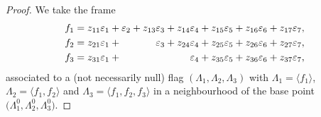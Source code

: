 \documentclass[pdftex]{sigma}
\numberwithin{equation}{section}
\theoremstyle{definition}
\newcommand{\0}{\boldsymbol{0}}
\begin{document}
\begin{proof}
We take the frame
\begin{align*}
f_1 & = z_{11}\varepsilon_1 + \varepsilon_2 + z_{13} \varepsilon_3 + z_{14} \varepsilon_4 + z_{15} \varepsilon_5 +
z_{16} \varepsilon_6 + z_{17} \varepsilon_7,
\\
f_2 & = z_{21}\varepsilon_1 + \hphantom{\varepsilon_2 + z_{13}} \varepsilon_3 + z_{24} \varepsilon_4 + z_{25} \varepsilon_5 + z_{26} \varepsilon_6 + z_{27} \varepsilon_7,
\\
f_3 & = z_{31}\varepsilon_1 + \hphantom{\varepsilon_2 + z_{13} \varepsilon_3 + z_{14}} \varepsilon_4 + z_{35} \varepsilon_5 +
z_{36} \varepsilon_6 + z_{37} \varepsilon_7,
\end{align*}
associated to a (not necessarily null) flag $(\Lambda_1, \Lambda_2, \Lambda_3)$
with $\Lambda_1 = \langle f_1\rangle$, $\Lambda_2 = \langle f_1, f_2\rangle$ and $\Lambda_3 = \langle f_1, f_2, f_3\rangle$ in a neighbourhood of the base point $\bigl(\Lambda_1^0, \Lambda_2^0, \Lambda_3^0\bigr)$.


\end{proof}
\end{document}
